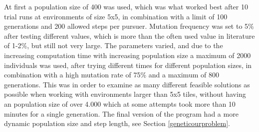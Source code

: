 At first a population size of 400 was used, which was what worked best after 10 trial runs at environments of size 5x5, in combination with a limit of 100 generations and 200 allowed steps per pursuer. Mutation frequency was set to 5\% after testing different values, which is more than the often used value in literature \cite{GAHandbook2} of 1-2\%, but still not very large. The parameters varied, and due to the increasing computation time with increasing population size a maximum of 2000 individuals was used, after trying different times for different population sizes, in combination with a high mutation rate of 75\% and a maximum of 800 generations. This was in order to examine as many different feasible solutions as possible when working with environments larger than 5x5 tiles, without having an population size of over 4.000 which at some attempts took more than 10 minutes for a single generation. The final version of the program had a more dynamic population size and step length, see Section \ref{geneticourproblem}.
